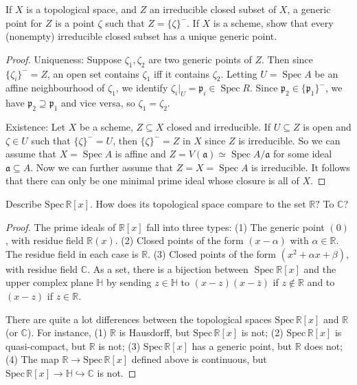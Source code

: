 \begin{exe}
	\label{2.2.9}
	If $X$ is a topological space, and $Z$ an irreducible closed subset of $X$, a generic point for $Z$ is a point $\zeta$ such that $Z=\{\zeta\}^{-} .$ If $X$ is a scheme, show that every (nonempty) irreducible closed subset has a unique generic point.
\end{exe}
\begin{proof}
	Uniqueness: Suppose $\zeta_{1}, \zeta_{2}$ are two generic points of $Z$. Then since $\{\zeta_{i}\}^-=Z$, an open set contains $\zeta_{1}$ iff it contains $\zeta_{2}$. Letting $U=\operatorname{Spec} A$ be an affine neighbourhood of $\zeta_{1}$, we identify $\zeta_{i}|_U=\mathfrak{p}_{i} \in \operatorname{Spec} R$. Since $\mathfrak{p}_{2} \in \{\mathfrak{p}_{1}\}^-$, we have $\mathfrak{p}_{2} \supseteq \mathfrak{p}_{1}$ and vice versa, so $\zeta_{1}=\zeta_{2}$.
	
	Existence: Let $X$ be a scheme, $Z \subseteq X$ closed and irreducible. If $U \subseteq Z$ is open and $\zeta \in U$ such that $\{\zeta\}^-=U$, then $\{\zeta\}^-=Z$ in $X$ since $Z$ is irreducible. So we can assume that $X=\operatorname{Spec} A$ is affine and $Z=V(\mathfrak{a})\simeq\operatorname{Spec} A / \mathfrak{a}$ for some ideal $\mathfrak{a} \subseteq A .$ Now we can further assume that $Z=X=\operatorname{Spec} A$ is irreducible. It follows that there can only be one minimal prime ideal whose closure is all of $X$.
\end{proof}

\begin{exe}
	\label{2.2.10}
	Describe $\mathrm{Spec}\, \mathbb{R}[x]$. How does its topological space compare to the set $\mathbb{R} ?$ To $\mathbb{C}$?
\end{exe}

\begin{proof}
	The prime ideals of $\mathbb{R}[x]$ fall into three types:
	(1) The generic point $(0)$, with residue field $\mathbb{R}(x)$.
	(2) Closed points of the form $(x-\alpha)$ with $\alpha \in \mathbb{R}$. The residue field in each case is $\mathbb{R}$.
	(3) Closed points of the form $\left(x^{2}+\alpha x+\beta\right)$, with residue field $\mathbb{C}$.
	As a set, there is a bijection between $\operatorname{Spec} \mathbb{R}[x]$ and the upper complex plane $\mathbb{H}$ by sending $z \in \mathbb{H}$ to $(x-z)(x-\bar{z})$ if $z \notin \mathbb{R}$ and
	to $(x-z)$ if $z \in \mathbb{R}$.
	
	There are quite a lot differences between the topological spaces $\mathrm{Spec}\,\mathbb{R}[x]$ and $\mathbb{R}$ (or $\mathbb{C}$). For instance, (1) $\mathbb{R}$ is Hausdorff, but $\mathrm{Spec}\,\mathbb{R}[x]$ is not; (2) $\mathrm{Spec}\,\mathbb{R}[x]$ is quasi-compact, but $\mathbb{R}$ is not; (3) $\mathrm{Spec}\,\mathbb{R}[x]$ has a generic point, but $\mathbb{R}$ does not;
	(4) The map $\mathbb{R}\to\mathrm{Spec}\,\mathbb{R}[x]$ defined above is continuous, but $\mathrm{Spec}\,\mathbb{R}[x]\to\mathbb{H}\hookrightarrow\mathbb{C}$ is not.
\end{proof}

